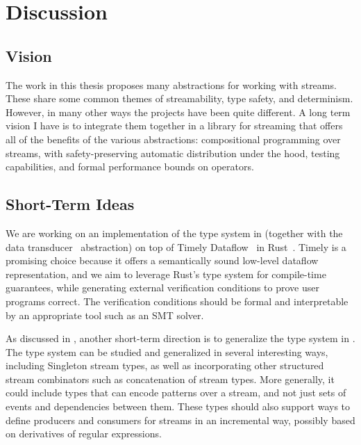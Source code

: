 \chapter{Discussion}
\label{cha:discussion}


\section{Vision}

The work in this thesis proposes many abstractions for working with streams. These share some common themes of streamability, type safety, and determinism.
However, in many other ways the projects have been quite different.
A long term vision I have is to integrate them together in a library for streaming that offers all of the benefits of the various abstractions:
compositional programming over streams, with safety-preserving automatic distribution under the hood, testing capabilities, and formal performance bounds on operators.

\section{Short-Term Ideas}

We are working on an implementation of the type system in  (together with the data transducer~ abstraction) on top of Timely Dataflow~\cite{Timely,Naiad2013} in Rust~\cite{RustLang}.
Timely is a promising choice because it offers a semantically sound low-level dataflow representation,
and we aim to leverage Rust's type system for compile-time guarantees,
while generating external verification conditions to prove user programs correct.
The verification conditions should be formal and interpretable by an appropriate tool such as an SMT solver.

As discussed in , another short-term direction is to generalize the type system in .
The type system can be studied and generalized in several interesting ways, including Singleton stream types, as well as incorporating other structured stream combinators such as concatenation of stream types.
More generally, it could include types that can encode patterns over a stream, and not just sets of events and dependencies between them.
These types should also support ways to define producers and consumers for streams in an incremental way, possibly based on derivatives of regular expressions.

